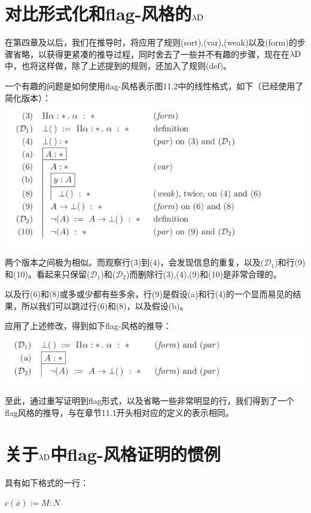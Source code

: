 \documentclass[UTF8]{article}
\begin{document}
	\section{对比形式化和flag-风格的$\lambda{\rm D}$}
	\noindent
	在第四章及以后，我们在推导时，将应用了规则(sort),(var),(weak)以及(form)的步骤省略，以获得更紧凑的推导过程，同时舍去了一些并不有趣的步骤，现在在$\lambda{\rm D}$中，也将这样做，除了上述提到的规则，还加入了规则(def)。
	
		一个有趣的问题是如何使用flag-风格表示图11.2中的线性格式，如下（已经使用了简化版本）：\\
		\includegraphics[width=0.93\linewidth]{"../imgs/11-2.png"}
		
		两个版本之间极为相似。而观察行(3)到(4)，会发现信息的重复，以及($\mathcal{D}_1$)和行(9)和(10)。看起来只保留($\mathcal{D}_1$)和($\mathcal{D}_2$)而删除行(3),(4),(9)和(10)是非常合理的。
		
		以及行(6)和(8)或多或少都有些多余，行(9)是假设(a)和行(4)的一个显而易见的结果，所以我们可以跳过行(6)和(8)，以及假设(b)。
		
		应用了上述修改，得到如下flag-风格的推导：\\
		\includegraphics[width=0.93\linewidth]{"../imgs/11-3.png"}
		
		至此，通过重写证明到flag形式，以及省略一些非常明显的行，我们得到了一个flag风格的推导，与在章节11.1开头相对应的定义的表示相同。
		
	\section{关于$\lambda{\rm D}$中flag-风格证明的惯例}
	\noindent
	具有如下格式的一行：
	
		$c(\overline{x}):=M:N$
	
\end{document}
